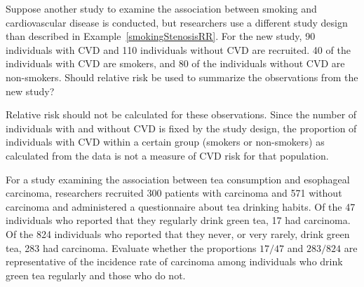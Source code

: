 
\begin{examplewrap}
\begin{nexample}{Suppose another study to examine the association between smoking and cardiovascular disease is conducted, but researchers use a different study design than described in Example~\ref{smokingStenosisRR}. For the new study, 90 individuals with CVD and 110 individuals without CVD are recruited. 40 of the individuals with CVD are smokers, and 80 of the individuals without CVD are non-smokers. Should relative risk be used to summarize the observations from the new study?}
	
Relative risk should not be calculated for these observations. Since the number of individuals with and without CVD is fixed by the study design, the proportion of individuals with CVD within a certain group (smokers or non-smokers) as calculated from the data is not a measure of CVD risk for that population.
\end{nexample}
\end{examplewrap}

\textD{\newpage}

\begin{exercisewrap}
\begin{nexercise}
For a study examining the association between tea consumption and esophageal carcinoma, researchers recruited 300 patients with carcinoma and 571 without carcinoma and administered a questionnaire about tea drinking habits.\footnotemark{} Of the 47 individuals who reported that they regularly drink green tea, 17 had carcinoma. Of the 824 individuals who reported that they never, or very rarely, drink green tea, 283 had carcinoma. Evaluate whether the proportions $17/47$ and $283/824$ are representative of the incidence rate of carcinoma among individuals who drink green tea regularly and those who do not.\footnotemark{}
\end{nexercise}
\end{exercisewrap}
\addtocounter{footnote}{-1}%
%
\addtocounter{footnote}{1}%

